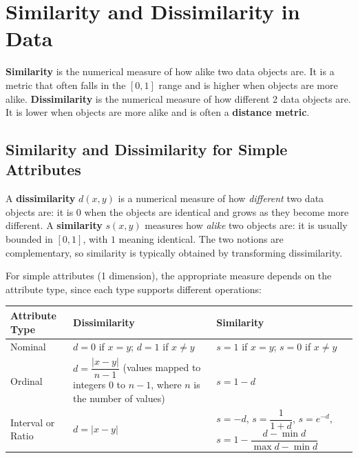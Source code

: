 \section{Similarity and Dissimilarity in Data}
\textbf{Similarity} is the numerical measure of how alike two data objects are. It is a metric that often falls in the $[0,1]$ range and is higher when objects are more alike. \textbf{Dissimilarity} is the numerical measure of how different 2 data objects are. It is lower when objects are more alike and is often a \textbf{distance metric}.

\subsection{Similarity and Dissimilarity for Simple Attributes}
A \textbf{dissimilarity} $d(x,y)$ is a numerical measure of how \emph{different} two data objects are: it is $0$ when the objects are identical and grows as they become more different. A \textbf{similarity} $s(x,y)$ measures how \emph{alike} two objects are: it is usually bounded in $[0,1]$, with $1$ meaning identical. The two notions are complementary, so similarity is typically obtained by transforming dissimilarity.
 
For simple attributes (1 dimension), the appropriate measure depends on the attribute type, since each type supports different operations:
 
\begin{center}
    \small
    \renewcommand{\arraystretch}{1.4}
    \begin{tabular}{|l|p{4.6cm}|p{5.2cm}|}
    \hline
    \textbf{Attribute Type} & \textbf{Dissimilarity} & \textbf{Similarity} \\
    \hline
    Nominal & $d=0$ if $x=y$; \newline $d=1$ if $x\neq y$ & $s=1$ if $x=y$; \newline $s=0$ if $x\neq y$ \\
    \hline
    Ordinal & $d=\dfrac{|x-y|}{n-1}$ \newline (values mapped to integers $0$ to $n-1$, where $n$ is the number of values) & $s=1-d$ \\
    \hline
    Interval or Ratio & $d=|x-y|$ & $s=-d$, \quad $s=\dfrac{1}{1+d}$, \quad $s=e^{-d}$, \newline $s=1-\dfrac{d-\min d}{\max d-\min d}$ \\
    \hline
    \end{tabular}
\end{center}
 
